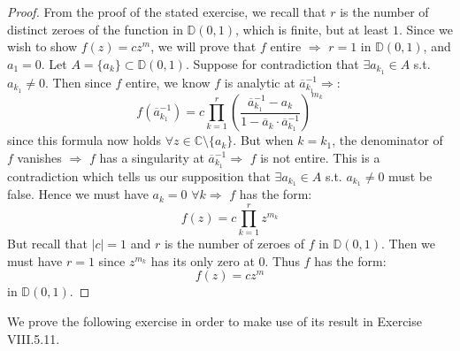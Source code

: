\documentclass[10pt]{article}
\begin{document}
\begin{proof}
From the proof of the stated exercise, we recall that $r$ is the number of distinct zeroes of the function in $\mathbb{D}(0,1)$, which is finite, but at least $1$. Since we wish to show $f(z) = cz^m$, we will prove that $f$ entire $\Rightarrow$ $r = 1$ in $\mathbb{D}(0,1)$, and $a_1 = 0$. Let $A = \{a_k\} \subset \mathbb{D}(0,1)$. Suppose for contradiction that $\exists a_{k_1} \in A$ s.t. $a_{k_1} \neq 0$. Then since $f$ entire, we know $f$ is analytic at $\overline{a}_{k_1}^{-1} \Rightarrow$: 
\[f(\overline{a}_{k_1}^{-1}) = c \prod_{k = 1}^r \left(\frac{\overline{a}_{k_1}^{-1} - a_k}{1 - \overline{a}_k\cdot \overline{a}_{k_1}^{-1}}\right)^{m_k}\]
since this formula now holds $\forall z \in \mathbb{C} \setminus \{a_k\}$. 
But when $k = k_1$, the denominator of $f$ vanishes $\Rightarrow$ $f$ has a singularity at $\overline{a}_{k_1}^{-1} \Rightarrow$ $f$ is not entire. This is a contradiction which tells us our supposition that $\exists a_{k_1} \in A$ s.t. $a_{k_1} \neq 0$ must be false. Hence we must have $a_k = 0$ $\forall k \Rightarrow$ $f$ has the form: 
\[f(z) = c \prod_{k = 1}^r z^{m_k}\]
But recall that $|c| = 1$ and $r$ is the number of zeroes of $f$ in $\mathbb{D}(0,1)$. Then we must have $r= 1$ since $z^{m_k}$ has its only zero at $0$. Thus $f$ has the form: 
\[f(z) = c z^{m}\]
in $\mathbb{D}(0,1)$. 
\end{proof}

We prove the following exercise in order to make use of its result in Exercise VIII.5.11. 
\end{document}
